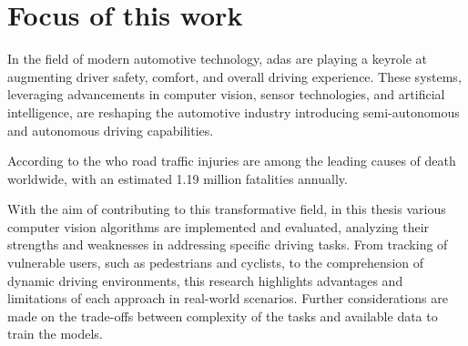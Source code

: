 



\section{Focus of this work}
%
In the field of modern automotive technology, \ac{adas} are playing a keyrole at augmenting driver safety, comfort, and overall driving experience.
These systems, leveraging advancements in computer vision, sensor technologies, and artificial intelligence, are reshaping the automotive industry introducing semi-autonomous and autonomous driving capabilities.

According to the \ac{who} road traffic injuries are among the leading causes of death worldwide, with an estimated 1.19 million fatalities annually.

\cite{key}
With the aim of contributing to this transformative field, in this thesis various computer vision algorithms are implemented and evaluated, analyzing their strengths and weaknesses in addressing specific driving tasks.
From tracking of vulnerable users, such as pedestrians and cyclists, to the comprehension of dynamic driving environments, this research highlights advantages and limitations of each approach in real-world scenarios.
Further considerations are made on the trade-offs between complexity of the tasks and available data to train the models. 

